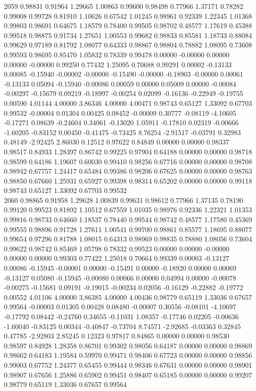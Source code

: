 {2059 0.98831 0.91964 1.29665 1.00863 0.99600 0.98498 0.77966 1.37171 0.78282 0.99008 0.99728 0.81910 1.10626 0.67542 1.01245 0.98961 0.92339 1.22345 1.01368 0.99803 0.98691 0.64675 1.18579 0.78400 0.99505 0.98702 0.48577 1.17619 0.45388 0.99518 0.98875 0.91734 1.27651 1.00553 0.99682 0.98833 0.85581 1.18733 0.88084 0.99629 0.97189 0.81792 1.08077 0.64333 0.98867 0.98804 0.78882 1.08095 0.73608 0.99593 0.98695 0.85470 1.05832 0.78339 0.99478 0.00000 -0.00000 0.00000 0.00000 -0.00000 0.99250 0.77432 1.25095 0.70688 0.99291 0.00002 -0.13133 0.00085 -0.15940 -0.00002 -0.00000 -0.15490 -0.00000 -0.18903 -0.00000 0.00061 -0.13133 0.05094 -0.15940 -0.00086 0.00059 0.00000 0.05009 0.00000 -0.00084 -0.00297 -0.15679 0.09219 -0.18997 -0.00254 0.02099 -0.16136 -0.22949 -0.19755 0.00590 4.01144 4.00000 3.86346 4.00000 4.00471 0.98743 0.65127 1.33092 0.67703 0.99532 -0.00004 0.01304 0.00425 0.08452 -0.00009 0.30777 -0.08119 -4.10605 -0.17271 0.08639 -0.24604 0.34061 -0.13020 1.05911 -0.17810 0.02319 -0.00666 -1.60205 -0.83152 0.00450 -0.41475 -0.73425 8.76254 -2.91517 -0.03791 0.32983 0.48149 -2.92425 2.86030 0.12512 0.97622 0.84849 0.00000 0.00000 0.98337 0.98517 0.84933 1.28397 0.86742 0.99225 0.97904 0.64188 0.00000 0.00000 0.98718 0.98599 0.64186 1.19607 0.60030 0.99410 0.98256 0.67716 0.00000 0.00000 0.98708 0.98942 0.67757 1.24417 0.65484 0.99386 0.98206 0.67625 0.00000 0.00000 0.98763 0.98850 0.67660 1.25931 0.65927 0.99398 0.98314 0.65202 0.00000 0.00000 0.99118 0.98743 0.65127 1.33092 0.67703 0.99532 \\
2060 0.98865 0.91958 1.29628 1.00839 0.99631 0.98612 0.77966 1.37135 0.78190 0.99120 0.99523 0.81892 1.10512 0.67559 1.01035 0.98976 0.92336 1.22321 1.01353 0.99816 0.98733 0.64660 1.18537 0.78440 0.99544 0.98742 0.48577 1.17580 0.45369 0.99555 0.98896 0.91728 1.27611 1.00541 0.99700 0.98861 0.85577 1.18695 0.88077 0.99654 0.97296 0.81788 1.08015 0.64313 0.98969 0.98835 0.78880 1.08056 0.73604 0.99622 0.98742 0.85469 1.05798 0.78332 0.99523 0.00000 0.00000 -0.00000 0.00000 0.00000 0.99303 0.77422 1.25018 0.70664 0.99339 0.00003 -0.13127 0.00086 -0.15945 -0.00001 0.00000 -0.15491 0.00000 -0.18920 0.00000 0.00069 -0.13127 0.05080 -0.15945 -0.00080 0.00066 0.00000 0.04994 0.00000 -0.00078 -0.00275 -0.15681 0.09191 -0.19015 -0.00234 0.02056 -0.16129 -0.22882 -0.19772 0.00552 4.01106 4.00000 3.86385 4.00000 4.00436 0.98779 0.65119 1.33036 0.67657 0.99564 -0.00003 0.01305 0.00428 0.08480 -0.00007 0.30556 -0.08101 -4.10697 -0.17792 0.08442 -0.24760 0.34655 -0.11031 1.08357 -0.17746 0.02205 -0.00636 -1.60040 -0.83125 0.00344 -0.40847 -0.73704 8.74571 -2.92685 -0.03363 0.32845 0.47785 -2.92803 2.85245 0.12323 0.97817 0.84865 0.00000 0.00000 0.98530 0.98597 0.84928 1.28358 0.86701 0.99302 0.98056 0.64187 0.00000 0.00000 0.98869 0.98662 0.64183 1.19584 0.59970 0.99471 0.98406 0.67723 0.00000 0.00000 0.98856 0.99003 0.67752 1.24377 0.65455 0.99444 0.98346 0.67631 0.00000 0.00000 0.98901 0.98907 0.67656 1.25886 0.65902 0.99451 0.98407 0.65185 0.00000 0.00000 0.99207 0.98779 0.65119 1.33036 0.67657 0.99564 \\
}
